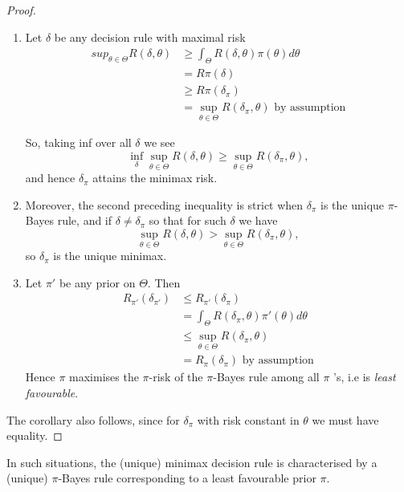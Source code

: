 \documentclass[a4paper]{article}
\begin{document}
\begin{proof}
	\begin{enumerate}[label=\roman*)]
		\item Let $\delta$ be any decision rule with maximal risk 
			\begin{align*}
				sup_{\theta\in \Theta} R(\delta,\theta) &\ge  \int_{\Theta} R(\delta,\theta)\pi(\theta)d\theta \\
				&= R\pi(\delta) \\
				&\ge R\pi(\delta_{\pi}) \\
				&= \sup_{\theta \in \Theta} R(\delta_{\pi},\theta) \text{ by assumption}
			\end{align*}

			So, taking inf over all $\delta$ we see
			\[
				\inf_{\delta} \sup_{\theta \in  \Theta} R(\delta,\theta) \ge  \sup_{\theta \in  \Theta} R(\delta_{\pi},\theta)
			,\]
			and hence $\delta_{\pi}$ attains the minimax risk.

		\item Moreover, the second preceding inequality is strict when $\delta_{\pi}$ is the unique $\pi$-Bayes rule, and if $\delta \neq \delta_{\pi}$ so that for such $\delta$ we have
			\[
				\sup_{\theta \in \Theta} R(\delta, \theta) > \sup_{\theta \in \Theta} R(\delta_{\pi},\theta)
			,\]
			so $\delta_{\pi}$ is the unique minimax.
		\item Let $\pi'$ be any prior on $\Theta$. Then
			\begin{align*}
				R_{\pi'}(\delta_{\pi'}) &\le R_{\pi'}(\delta_{\pi}) \\
				&= \int_{\Theta} R(\delta_{\pi}, \theta) \pi'(\theta)d\theta \\
				&\le \sup_{\theta \in \Theta} R(\delta_{\pi},\theta) \\
				&= R_{\pi}(\delta_{\pi}) \text{ by assumption}
			\end{align*}
			Hence $\pi$ maximises the $\pi$-risk of the $\pi$-Bayes rule among all $\pi$ 's, i.e is \textit{least favourable}.
	\end{enumerate}

	The corollary also follows, since for $\delta_{\pi}$ with risk constant in $\theta$ we must have equality.
\end{proof}

In such situations, the (unique) minimax decision rule is characterised by a (unique) $\pi$-Bayes rule corresponding to a least favourable prior $\pi$.
\end{document}
